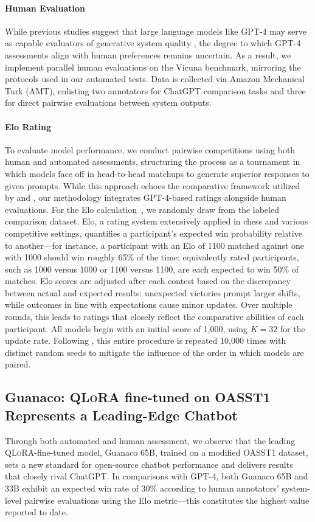 \paragraph{Human Evaluation} While previous studies suggest that large language models like GPT-4 may serve as capable evaluators of generative system quality \citep{fu2023gptscore}, the degree to which GPT-4 assessments align with human preferences remains uncertain. As a result, we implement parallel human evaluations on the Vicuna benchmark, mirroring the protocols used in our automated tests. Data is collected via Amazon Mechanical Turk (AMT), enlisting two annotators for ChatGPT comparison tasks and three for direct pairwise evaluations between system outputs.

\paragraph{Elo Rating} To evaluate model performance, we conduct pairwise competitions using both human and automated assessments, structuring the process as a tournament in which models face off in head-to-head matchups to generate superior responses to given prompts. While this approach echoes the comparative framework utilized by \citet{bai2022training} and \citet{vicuna2023}, our methodology integrates GPT-4-based ratings alongside human evaluations. For the Elo calculation~\citep{elo1967proposed,elo1978rating}, we randomly draw from the labeled comparison dataset. Elo, a rating system extensively applied in chess and various competitive settings, quantifies a participant’s expected win probability relative to another—for instance, a participant with an Elo of 1100 matched against one with 1000 should win roughly 65\% of the time; equivalently rated participants, such as 1000 versus 1000 or 1100 versus 1100, are each expected to win 50\% of matches. Elo scores are adjusted after each contest based on the discrepancy between actual and expected results: unexpected victories prompt larger shifts, while outcomes in line with expectations cause minor updates. Over multiple rounds, this leads to ratings that closely reflect the comparative abilities of each participant. All models begin with an initial score of 1,000, using $K=32$ for the update rate. Following \citet{vicuna2023}, this entire procedure is repeated 10,000 times with distinct random seeds to mitigate the influence of the order in which models are paired.

\subsection{\textbf{Guanaco}: \textsc{QLoRA} fine-tuned on OASST1 Represents a Leading-Edge Chatbot} Through both automated and human assessment, we observe that the leading \textsc{QLoRA}-fine-tuned model, {Guanaco} 65B, trained on a modified OASST1 dataset, sets a new standard for open-source chatbot performance and delivers results that closely rival ChatGPT. In comparisons with GPT-4, both {Guanaco} 65B and 33B exhibit an expected win rate of 30\% according to human annotators' system-level pairwise evaluations using the Elo metric—this constitutes the highest value reported to date.

